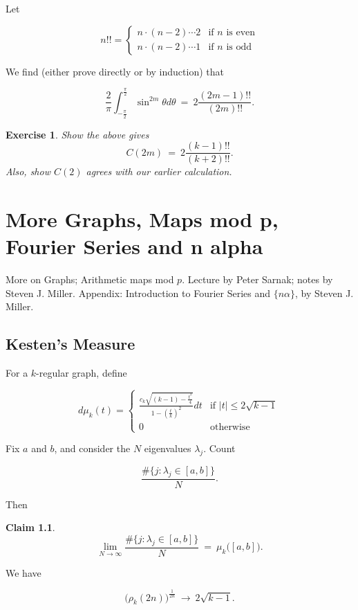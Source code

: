 \documentclass[12pt,letterpaper]{report}
\newcommand\be{\begin{equation}}
\newcommand\ee{\end{equation}}
\newtheorem{exe}[thm]{Exercise}
\newtheorem{cla}[thm]{Claim}
\newcommand{\twocase}[5]{#1 \begin{cases} #2 & \text{#3}\\ #4
&\text{#5} \end{cases}   }
\begin{document}
Let

\be \twocase{n!! = }{n \cdot (n-2) \cdots 2}{if $n$ is even}{n
\cdot (n-2) \cdots 1}{if $n$ is odd} \ee

We find (either prove directly or by induction) that

\be \frac{2}{\pi}\int_{-\frac{\pi}{2}}^{\frac{\pi}{2}} \sin^{2m}
\theta d\theta \ = \ 2 \frac{(2m-1)!!}{(2m)!!}. \ee

\begin{exe} Show the above gives
\be C(2m) \ = \ 2 \frac{(k-1)!!}{(k+2)!!}. \ee Also, show $C(2)$
agrees with our earlier calculation.
\end{exe}






\chapter{More Graphs, Maps mod p, Fourier Series and {n alpha}}

More on Graphs; Arithmetic maps mod $p$. Lecture by Peter Sarnak;
notes by Steven J. Miller. Appendix: Introduction to Fourier
Series and $\{n \alpha\}$, by Steven J. Miller.

\section{Kesten's Measure}

For a $k$-regular graph, define

\be \twocase{d\mu_k(t) = }{\frac{c_k \sqrt{(k-1) - \frac{t^2}{4}}
}{ 1 - (\frac{t}{k})^2 }dt}{if $|t| \le
2\sqrt{k-1}$}{0}{otherwise} \ee

Fix $a$ and $b$, and consider the $N$ eigenvalues $\lambda_j$.
Count

\be \frac{ \# \{j: \lambda_j \in [a,b] \} }{N}. \ee

Then

\begin{cla}
\be \lim_{N \to \infty} \frac{ \# \{j: \lambda_j \in [a,b] \} }{N}
\ = \ \mu_k\Big([a,b]\Big). \ee
\end{cla}

We have

\be \Big( \rho_k(2n) \Big)^{\frac{1}{2n}} \ \to \ 2 \sqrt{k-1}.
\ee
\end{document}
